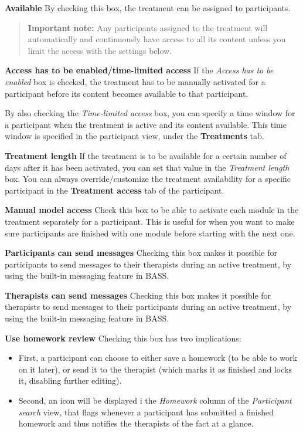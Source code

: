 \documentclass[
]{book}
\providecommand{\tightlist}{%
  \setlength{\itemsep}{0pt}\setlength{\parskip}{0pt}}
\begin{document}
\textbf{Available}
By checking this box, the treatment can be assigned to participants.

\begin{quote}
\textbf{Important note:} Any participants assigned to the treatment will automatically and continuously have access to all its content unless you limit the access with the settings below.
\end{quote}

\textbf{Access has to be enabled/time-limited access}
If the \emph{Access has to be enabled} box is checked, the treatment has to be manually activated for a participant before its content becomes available to that participant.

By also checking the \emph{Time-limited access} box, you can specify a time window for a participant when the treatment is active and its content available. This time window is specified in the participant view, under the \textbf{Treatments} tab.

\textbf{Treatment length}
If the treatment is to be available for a certain number of days after it has been activated, you can set that value in the \emph{Treatment length} box. You can always override/customize the treatment availability for a specific participant in the \textbf{Treatment access} tab of the participant.

\textbf{Manual model access}
Check this box to be able to activate each module in the treatment separately for a participant. This is useful for when you want to make sure participants are finished with one module before starting with the next one.

\textbf{Participants can send messages}
Checking this box makes it possible for participants to send messages to their therapists during an active treatment, by using the built-in messaging feature in BASS.

\textbf{Therapists can send messages}
Checking this box makes it possible for therapists to send messages to their participants during an active treatment, by using the built-in messaging feature in BASS.

\textbf{Use homework review}
Checking this box has two implications:

\begin{itemize}
\tightlist
\item
  First, a participant can choose to either save a homework (to be able to work on it later), or send it to the therapist (which marks it as finished and locks it, disabling further editing).
\item
  Second, an icon will be displayed i the \emph{Homework} column of the \emph{Participant search} view, that flags whenever a participant has submitted a finished homework and thus notifies the therapists of the fact at a glance.
\end{itemize}
\end{document}

